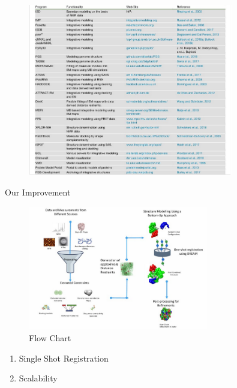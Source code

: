 \begin{frame}

    \begin{figure}
        \centering
        \includegraphics[width=0.8\textwidth]{images/table.png}
        \label{fig:my_label}
    \end{figure}
    
\end{frame}

\begin{frame}{Our Improvement}
    \begin{figure}
        \centering
        \includegraphics[width=0.7\textwidth]{images/dream.png}
        \caption{Flow Chart}
        \label{fig:my_label}
    \end{figure}

    \begin{enumerate}
        \item Single Shot Registration
        \item Scalability
    \end{enumerate}
\end{frame}

